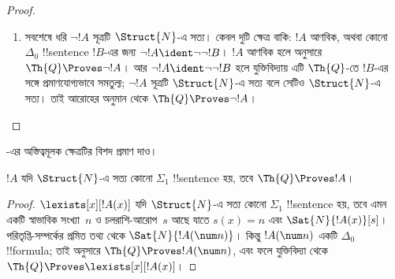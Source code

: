 \documentclass[../../../include/open-logic-section]{subfiles}
\begin{document}
\begin{proof}
\begin{enumerate}
যেখানে $t$ একটি বদ্ধ পদ। এই !!{sentence} $\Th{Q}$-তে
$\bforall{x<t}{\lnot!A(x)}$-এর সমতুল্য, তাই সীমাবদ্ধ সর্বজনীন
পরিমাণসূচকের যুক্তি প্রয়োগ করা যায়।
%
\item সবশেষে ধরি $\lnot !A$ সূত্রটি $\Struct{N}$-এ সত্য। কেবল দুটি ক্ষেত্র
বাকি: $!A$ আণবিক, অথবা কোনো $\Delta_0$ !!{sentence} $!B$-এর জন্য
$\lnot !A \ident \lnot\lnot !B$। $!A$ আণবিক হলে
 অনুসারে $\Th{Q} \Proves \lnot !A$। আর
$\lnot !A \ident \lnot\lnot !B$ হলে যুক্তিবিদ্যায় এটি $\Th{Q}$-তে
$!B$-এর সঙ্গে প্রমাণযোগ্যভাবে সমতুল্য; $\lnot !A$ সূত্রটি $\Struct{N}$-এ
সত্য বলে সেটিও $\Struct{N}$-এ সত্য। তাই আরোহের অনুমান থেকে
$\Th{Q} \Proves \lnot !A$।
\end{enumerate}
\end{proof}

\begin{prob}
-এর অস্তিত্বমূলক ক্ষেত্রটির বিশদ প্রমাণ দাও।
\end{prob}

\begin{thm}
$!A$ যদি $\Struct{N}$-এ সত্য কোনো $\Sigma_1$ !!{sentence} হয়, তবে
$\Th{Q} \Proves !A$।
\end{thm}

\begin{proof}
$\lexists[x][!A(x)]$ যদি $\Struct{N}$-এ সত্য কোনো $\Sigma_1$ !!{sentence}
হয়, তবে এমন একটি স্বাভাবিক সংখ্যা~$n$ ও চলরাশি-আরোপ~$s$ আছে যাতে
$s(x) = n$ এবং $\Sat{N}{!A(x)}[s]$।
পরিতৃপ্তি-সম্পর্কের প্রমিত তথ্য থেকে $\Sat{N}{!A(\num n)}$। কিন্তু
$!A(\num n)$ একটি $\Delta_0$ !!{formula}; তাই
 অনুসারে $\Th{Q} \Proves !A(\num n)$, এবং
ফলে যুক্তিবিদ্যা থেকে $\Th{Q} \Proves \lexists[x][!A(x)]$।
\end{proof}
\end{document}
